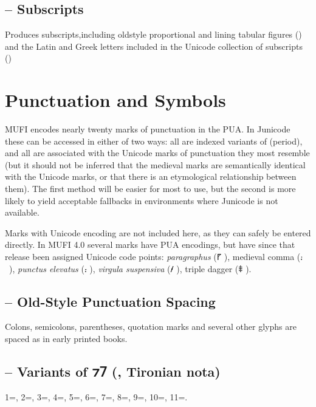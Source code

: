 \subsection{ – Subscripts}
Produces subscripts,including oldstyle proportional and lining tabular figures
() and the Latin and Greek letters included in the Unicode collection of subscripts
()

\section{Punctuation and Symbols}

MUFI encodes nearly twenty marks of punctuation in the PUA. In Junicode these can be accessed in
either of two ways: all are indexed variants of  (period), and all are associated with the Unicode marks of
punctuation they most resemble (but it should not be inferred that the medieval marks are semantically identical with
the Unicode marks, or that there is an etymological relationship between them). The first method will be easier for
most to use, but the second is more likely to yield acceptable fallbacks in environments where Junicode is not
available.

Marks with Unicode encoding are not included here, as they can safely be entered directly. In MUFI 4.0 several marks
have PUA encodings, but have since that release been assigned Unicode code points: \textit{paragraphus} (⹍
), medieval comma (⹌~), \textit{punctus elevatus} (⹎ ), \textit{virgula suspensiva}
(⹊ ), triple dagger (⹋ ).

\subsection{ – Old-Style Punctuation Spacing}
Colons, semicolons, parentheses, quotation marks and several other glyphs are spaced as in early printed books.

\subsection{ – Variants of ⁊⹒
(, Tironian nota)}
1=, 2=, 3=, 4=, 5=,
6=, 7=, 8=, 9=,
10=, 11=.

